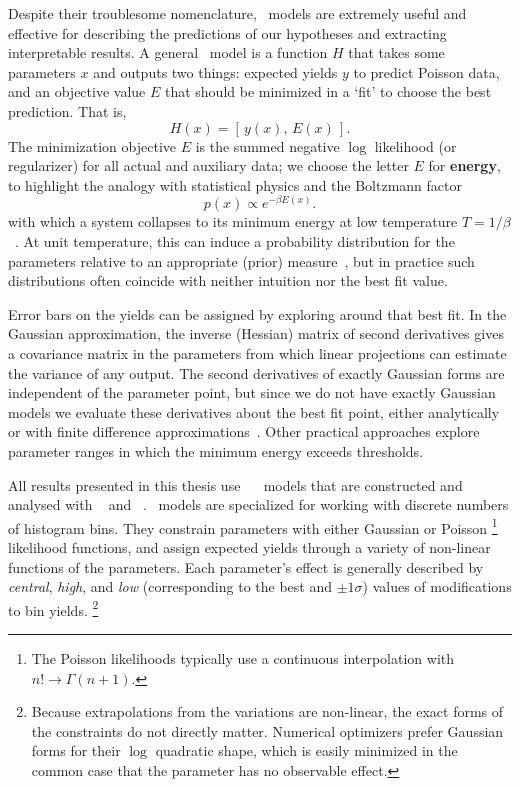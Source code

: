 Despite their troublesome nomenclature, \heplikelihood\ models are extremely
useful and effective for describing the predictions of our hypotheses and
extracting interpretable results.
A general \heplikelihood\ model is a function $H$ that takes some parameters $x$
and outputs two things:
expected yields $y$ to predict Poisson data,
and an objective value $E$ that should be minimized in a `fit' to choose the
best prediction.
That is,
\begin{equation}
H(x) = [\,y(x), \,E(x)\,]
.
\end{equation}
The minimization objective $E$ is the summed negative $\log$ likelihood
(or regularizer) for all actual and auxiliary data;
we choose the letter $E$ for \textbf{energy}, to highlight the analogy with
statistical physics and the Boltzmann factor
\begin{equation}
p(x) \propto e^{-\beta E(x)}
.
\end{equation}
with which a system collapses to its minimum energy at low temperature
$T = 1/\beta$~\cite{
skilling2017david,
lecun-06,
pmlr-v2-ranzato07a
}.
At unit temperature, this can induce a probability distribution
for the parameters relative to an appropriate (prior)
measure~\cite{cranmer2012histfactory, skilling2017david},
but in practice such distributions often coincide with neither intuition nor
the best fit value.

Error bars on the yields can be assigned by exploring around that best fit.
In the Gaussian approximation, the inverse (Hessian) matrix of second
derivatives gives a covariance matrix in the parameters from which linear
projections can estimate the variance of any output.
The second derivatives of exactly Gaussian forms are independent of the
parameter point, but since we do not have exactly Gaussian models we evaluate
these derivatives about the best fit point, either analytically or with finite
difference approximations~\cite{cranmer2021building}.
Other practical approaches explore parameter ranges in which the minimum energy
exceeds thresholds.

All results presented in this thesis use
\histfactory~\cite{cranmer2012histfactory} \heplikelihood\ models that are
constructed and analysed with
\histfitter~\cite{Besjes_2015,baak2015histfitter}
and \pyhf~\cite{heinrich2021pyhf}.
\histfactory\ models are specialized for working with discrete numbers of
histogram bins.
They constrain parameters with either Gaussian or Poisson%
\footnote{%
The Poisson likelihoods typically use a continuous interpolation with
$n!\rightarrow \Gamma(n + 1)$.%
}
likelihood
functions, and assign expected yields through a variety of
non-linear functions of the parameters.
Each parameter's effect is generally described by
\emph{central}, \emph{high}, and \emph{low}
(corresponding to the best and $\pm1\sigma$)
values of modifications to bin yields.%
\footnote{%
Because extrapolations from the variations are non-linear, the exact forms of
the constraints do not directly matter.
Numerical optimizers prefer Gaussian forms for their $\log$ quadratic shape, which is
easily minimized in the common case that the parameter has no observable
effect.%
}

